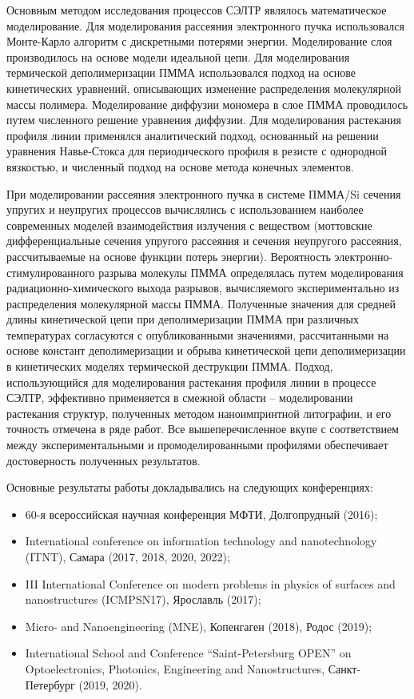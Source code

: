 \methods

Основным методом исследования процессов СЭЛТР являлось математическое моделирование. Для моделирования рассеяния электронного пучка использовался Монте-Карло алгоритм с дискретными потерями энергии. Моделирование слоя  производилось на основе модели идеальной цепи. Для моделирования термической деполимеризации ПММА использовался подход на основе кинетических уравнений, описывающих изменение распределения молекулярной массы полимера. Моделирование диффузии мономера в слое ПММА проводилось путем численного решение уравнения диффузии. Для моделирования растекания профиля линии применялся аналитический подход, основанный на решении уравнения Навье-Стокса для периодического профиля в резисте с однородной вязкостью, и численный подход на основе метода конечных элементов.


\probation
При моделировании рассеяния электронного пучка в системе ПММА/Si сечения упругих и неупругих процессов вычислялись с использованием наиболее современных моделей взаимодействия излучения с веществом (моттовские дифференциальные сечения упругого рассеяния и сечения неупругого рассеяния, рассчитываемые на основе функции потерь энергии). Вероятность электронно-стимулированного разрыва молекулы ПММА определялась путем моделирования радиационно-химического выхода разрывов, вычисляемого экспериментально из распределения молекулярной массы ПММА. Полученные значения для средней длины кинетической цепи при деполимеризации ПММА при различных температурах согласуются с опубликованными значениями, рассчитанными на основе констант деполимеризации и обрыва кинетической цепи деполимеризации в кинетических моделях термической деструкции ПММА. Подход, использующийся для моделирования растекания профиля линии в процессе СЭЛТР, эффективно применяется в смежной области -- моделировании растекания структур, полученных методом наноимпринтной литографии, и его точность отмечена в ряде работ. Все вышеперечисленное вкупе с соответствием между экспериментальными и промоделированными профилями обеспечивает достоверность полученных результатов.

Основные результаты работы докладывались на следующих конференциях:
\begin{itemize}
	\item 60-я всероссийская научная конференция МФТИ, Долгопрудный (2016);
	\item International conference on information technology and nanotechnology (ITNT), Самара (2017, 2018, 2020, 2022);
	\item III International Conference on modern problems in physics of surfaces and nanostructures (ICMPSN17), Ярославль (2017);
	\item Micro- and Nanoengineering (MNE), Копенгаген (2018), Родос (2019);
	\item International School and Conference ``Saint-Petersburg OPEN'' on Optoelectronics, Photonics, Engineering and Nanostructures, Санкт-Петербург (2019, 2020).	
\end{itemize}

